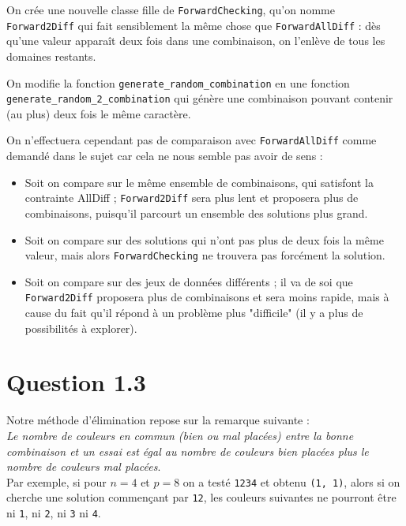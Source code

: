 \documentclass[a4paper, 12pt]{report}
\newcommand{\py}[1]{\texttt{#1}}
\begin{document}
On crée une nouvelle classe fille de \py{ForwardChecking}, qu'on nomme \py{Forward2Diff} qui fait sensiblement la même chose que \py{ForwardAllDiff} : dès qu'une valeur apparaît deux fois dans une combinaison, on l'enlève de tous les domaines restants.

On modifie la fonction \py{generate_random_combination} en une fonction \\
\py{generate_random_2_combination} qui génère une combinaison pouvant contenir (au plus) deux fois le même caractère.

On n'effectuera cependant pas de comparaison avec \py{ForwardAllDiff} comme demandé dans le sujet car cela ne nous semble pas avoir de sens :

\begin{itemize}
	\item Soit on compare sur le même ensemble de combinaisons, qui satisfont la contrainte AllDiff ; \py{Forward2Diff} sera plus lent et proposera plus de combinaisons, puisqu'il parcourt un ensemble des solutions plus grand.
	
	\item Soit on compare sur des solutions qui n'ont pas plus de deux fois la même valeur, mais alors \py{ForwardChecking} ne trouvera pas forcément la solution.
	
	\item Soit on compare sur des jeux de données différents ; il va de soi que \py{Forward2Diff} proposera plus de combinaisons et sera moins rapide, mais à cause du fait qu'il répond à un problème plus "difficile" (il y a plus de possibilités à explorer).
\end{itemize}

\section*{Question 1.3}

Notre méthode d'élimination repose sur la remarque suivante : \\

\textit{Le nombre de couleurs en commun (bien ou mal placées) entre la bonne combinaison et un essai est égal au nombre de couleurs bien placées plus le nombre de couleurs mal placées}. \\

Par exemple, si pour $n = 4$ et $p = 8$ on a testé \py{1234} et obtenu \py{(1, 1)}, alors si on cherche une solution commençant par \py{12}, les couleurs suivantes ne pourront être ni \py{1}, ni \py{2}, ni \py{3} ni \py{4}.
\end{document}
